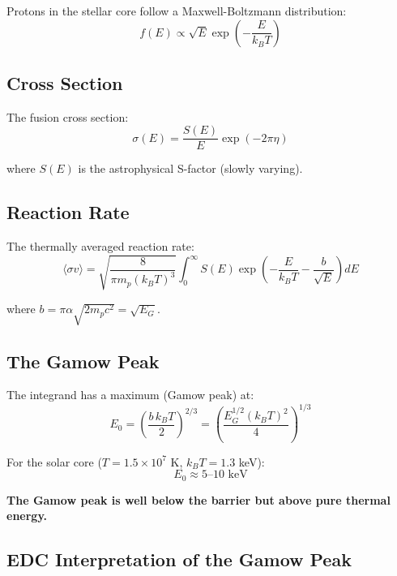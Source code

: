 \documentclass[12pt,a4paper]{article}
\begin{document}
Protons in the stellar core follow a Maxwell-Boltzmann distribution:
\begin{equation}
f(E) \propto \sqrt{E} \exp\left(-\frac{E}{k_BT}\right)
\end{equation}

\subsection{Cross Section}

The fusion cross section:
\begin{equation}
\sigma(E) = \frac{S(E)}{E} \exp(-2\pi\eta)
\end{equation}

where $S(E)$ is the astrophysical S-factor (slowly varying).

\subsection{Reaction Rate}

The thermally averaged reaction rate:
\begin{equation}
\langle\sigma v\rangle = \sqrt{\frac{8}{\pi m_p (k_BT)^3}} \int_0^\infty S(E) \exp\left(-\frac{E}{k_BT} - \frac{b}{\sqrt{E}}\right) dE
\end{equation}

where $b = \pi\alpha\sqrt{2m_pc^2} = \sqrt{E_G}$.

\subsection{The Gamow Peak}

The integrand has a maximum (Gamow peak) at:
\begin{equation}
E_0 = \left(\frac{b \, k_BT}{2}\right)^{2/3} = \left(\frac{E_G^{1/2} (k_BT)^2}{4}\right)^{1/3}
\end{equation}

For the solar core ($T = 1.5 \times 10^7$ K, $k_BT = 1.3$ keV):
\begin{equation}
E_0 \approx 5\text{--}10 \text{ keV}
\end{equation}

\textbf{The Gamow peak is well below the barrier but above pure thermal energy.}

\subsection{EDC Interpretation of the Gamow Peak}
\end{document}

